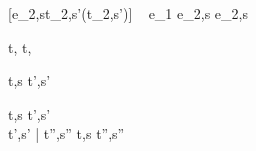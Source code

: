[e_2,s\evaluate t_2,s'\wedge \neg\Failing(t_2,s')]
  {\ }
  {e_1 \Xor e_2,s \handle{\Right} e_2,s}











  { }
  {t,\Sigma {} t,\Sigma}





  {t,s  t',s'}


  {t,s    t',s' \\
   t',s' \bar{\normalise} t'',s''}
  {t,s  t'',s''}
